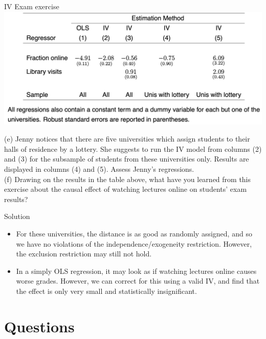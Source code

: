 \documentclass[11pt,xcolor=table]{beamer}
\begin{document}
\begin{frame}[allowframebreaks]{IV Exam exercise}
\framebreak 
\includegraphics[width=1.0\textwidth]{tables/IV_Table.png}

\framebreak 


(e) Jenny notices that there are five universities which assign students to their halls of residence by a lottery. She suggests to run the IV model from columns (2) and (3) for the subsample of students from these universities only. Results are displayed in columns (4) and (5). Assess Jenny’s regressions.\\

(f) Drawing on the results in the table above, what have you learned from this exercise about the causal effect of watching lectures online on students’ exam results?


\framebreak 
\alert{Solution}
\begin{itemize}
    \item For these universities, the distance is as good as randomly assigned, and so we have no violations of the independence/exogeneity restriction. However, the exclusion restriction may still not hold.
    \item In a simply OLS regression, it may look as if watching lectures online causes worse grades. However, we can correct for this using a valid IV, and find that the effect is only very small and statistically insignificant.
\end{itemize}


\end{frame}




\section{Questions}
\end{document}
